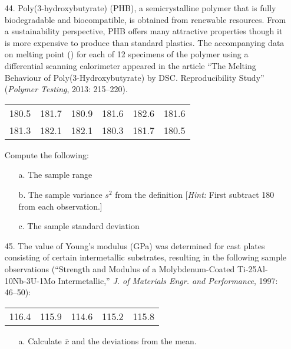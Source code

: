 \documentclass[letterpaper,12pt]{article}
\begin{document}
\maketitle

\begin{enumerate}
  \item[44.]
    Poly(3-hydroxybutyrate) (PHB), a semicrystalline polymer that is fully biodegradable and biocompatible, is obtained from renewable resources. From a sustainability perspective, PHB offers many attractive properties though it is more expensive to produce than standard plastics. The accompanying data on melting point (\textcelsius) for each of 12 specimens of the polymer using a differential scanning calorimeter appeared in the article ``The Melting Behaviour of Poly(3-Hydroxybutyrate) by DSC. Reproducibility Study'' (\textit{Polymer Testing}, 2013: 215–220).
    \begin{center}
      \begin{tabular}{*{6}{c}}
        180.5 & 181.7 & 180.9 & 181.6 & 182.6 & 181.6 \\
        181.3 & 182.1 & 182.1 & 180.3 & 181.7 & 180.5
      \end{tabular}
    \end{center}
    Compute the following:
    \begin{enumerate}
      \item[a.]
        The sample range
      \item[b.]
        The sample variance $s^2$ from the definition [\textit{Hint:} First subtract 180 from each observation.]
      \item[c.] The sample standard deviation
    \end{enumerate}
  \item[45.]
    The value of Young’s modulus (GPa) was determined for cast plates consisting of certain intermetallic substrates, resulting in the following sample observations (``Strength and Modulus of a Molybdenum-Coated Ti-25Al-10Nb-3U-1Mo Intermetallic,'' \textit{J. of Materials Engr. and Performance}, 1997: 46–50):
    \begin{center}
      \begin{tabular}{*{5}{c}}
        116.4 & 115.9 & 114.6 & 115.2 & 115.8
      \end{tabular}
    \end{center}
    \begin{enumerate}
      \item[a.]
        Calculate $\bar{x}$ and the deviations from the mean.

\end{enumerate}
\end{enumerate}
\end{document}
